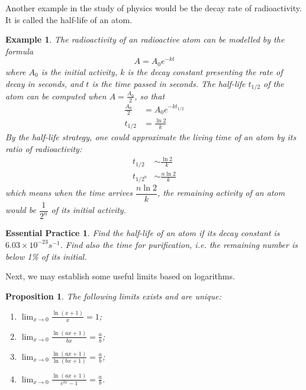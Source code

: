 \documentclass[12pt]{article}
\newtheorem*{proposition}{Proposition}
\newtheorem*{example}{Example}
\newtheorem{exercise}{Essential Practice}[section]
\begin{document}
    Another example in the study of physics would be the decay rate of radioactivity. It is called the half-life of an atom.

    \begin{example}
        The radioactivity of an radioactive atom can be modelled by the formula \[A=A_0 e^{-kt}\] where $A_0$ is the initial activity, $k$ is the decay constant presenting the rate of decay in seconds, and $t$ is the time passed in seconds. The half-life $t_{1/2}$ of the atom can be computed when $A=\frac{A_0}{2}$, so that \begin{align*}
            \frac{A_0}{2}&=A_0 e^{-kt_{1/2}}\\
            t_{1/2}&=\frac{\ln{2}}{k}
        \end{align*}
        By the half-life strategy, one could approximate the living time of an atom by its ratio of radioactivity: \begin{align*}
            t_{1/2}&\sim \frac{\ln{2}}{k}\\
            t_{1/2^n}&\sim \frac{n\ln{2}}{k}
        \end{align*}
        which means when the time arrives $\dfrac{n\ln{2}}{k}$, the remaining activity of an atom would be $\dfrac{1}{2^n}$ of its initial activity.
    \end{example}

    \begin{exercise}
        Find the half-life of an atom if its decay constant is $6.03\times 10^{-23} s^{-1}$. Find also the time for purification, i.e. the remaining number is below 1\% of its initial.
    \end{exercise}

    Next, we may establish some useful limits based on logarithms.

    \begin{proposition}
        The following limits exists and are unique:\begin{enumerate}
            \item $\displaystyle\lim_{x\to 0}\frac{\ln(x+1)}{x}=1$;
            \item $\displaystyle\lim_{x\to 0}\frac{\ln(ax+1)}{bx}=\frac{a}{b}$;
            \item $\displaystyle\lim_{x\to 0}\frac{\ln(ax+1)}{\ln(bx+1)}=\frac{a}{b}$;
            \item $\displaystyle\lim_{x\to 0}\frac{\ln(ax+1)}{e^{bx}-1}=\frac{a}{b}$.
        \end{enumerate}
    \end{proposition}
\end{document}
